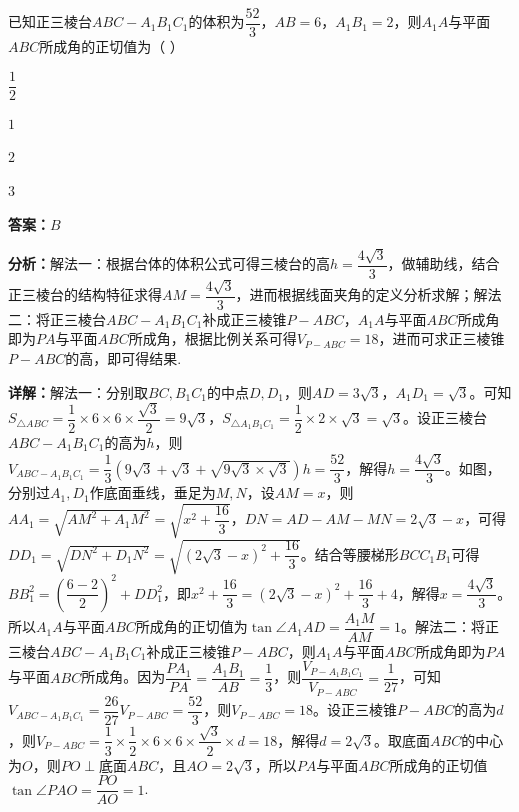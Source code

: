 \begin{question}[points=5]
已知正三棱台$ABC-A_1B_1C_1$的体积为$\dfrac{52}{3}$，$AB=6$，$A_1B_1=2$，则$A_1A$与平面$ABC$所成角的正切值为（ ）
\begin{choices}
  \item $\dfrac{1}{2}$
  \item $1$
  \item $2$
  \item $3$
\end{choices}
\begin{solution}
\textbf{答案：}$B$

\textbf{分析：}解法一：根据台体的体积公式可得三棱台的高$h=\dfrac{4\sqrt{3}}{3}$，做辅助线，结合正三棱台的结构特征求得$AM=\dfrac{4\sqrt{3}}{3}$，进而根据线面夹角的定义分析求解；解法二：将正三棱台$ABC-A_1B_1C_1$补成正三棱锥$P-ABC$，$A_1A$与平面$ABC$所成角即为$PA$与平面$ABC$所成角，根据比例关系可得$V_{P-ABC}=18$，进而可求正三棱锥$P-ABC$的高，即可得结果.

\textbf{详解：}解法一：分别取$BC,B_1C_1$的中点$D,D_1$，则$AD=3\sqrt{3}$，$A_1D_1=\sqrt{3}$。可知$S_{\triangle ABC}=\dfrac{1}{2}\times6\times6\times\dfrac{\sqrt{3}}{2}=9\sqrt{3}$，$S_{\triangle A_1B_1C_1}=\dfrac{1}{2}\times2\times\sqrt{3}=\sqrt{3}$。设正三棱台$ABC-A_1B_1C_1$的高为$h$，则$V_{ABC-A_1B_1C_1}=\dfrac{1}{3}(9\sqrt{3}+\sqrt{3}+\sqrt{9\sqrt{3}\times\sqrt{3}})h=\dfrac{52}{3}$，解得$h=\dfrac{4\sqrt{3}}{3}$。如图，分别过$A_1,D_1$作底面垂线，垂足为$M,N$，设$AM=x$，则$AA_1=\sqrt{AM^2+A_1M^2}=\sqrt{x^2+\dfrac{16}{3}}$，$DN=AD-AM-MN=2\sqrt{3}-x$，可得$DD_1=\sqrt{DN^2+D_1N^2}=\sqrt{(2\sqrt{3}-x)^2+\dfrac{16}{3}}$。结合等腰梯形$BCC_1B_1$可得$BB_1^2=\left(\dfrac{6-2}{2}\right)^2+DD_1^2$，即$x^2+\dfrac{16}{3}=(2\sqrt{3}-x)^2+\dfrac{16}{3}+4$，解得$x=\dfrac{4\sqrt{3}}{3}$。所以$A_1A$与平面$ABC$所成角的正切值为$\tan\angle A_1AD=\dfrac{A_1M}{AM}=1$。解法二：将正三棱台$ABC-A_1B_1C_1$补成正三棱锥$P-ABC$，则$A_1A$与平面$ABC$所成角即为$PA$与平面$ABC$所成角。因为$\dfrac{PA_1}{PA}=\dfrac{A_1B_1}{AB}=\dfrac{1}{3}$，则$\dfrac{V_{P-A_1B_1C_1}}{V_{P-ABC}}=\dfrac{1}{27}$，可知$V_{ABC-A_1B_1C_1}=\dfrac{26}{27}V_{P-ABC}=\dfrac{52}{3}$，则$V_{P-ABC}=18$。设正三棱锥$P-ABC$的高为$d$，则$V_{P-ABC}=\dfrac{1}{3}\times\dfrac{1}{2}\times6\times6\times\dfrac{\sqrt{3}}{2}\times d=18$，解得$d=2\sqrt{3}$。取底面$ABC$的中心为$O$，则$PO\perp$底面$ABC$，且$AO=2\sqrt{3}$，所以$PA$与平面$ABC$所成角的正切值$\tan\angle PAO=\dfrac{PO}{AO}=1$.
\end{solution}
\end{question}

